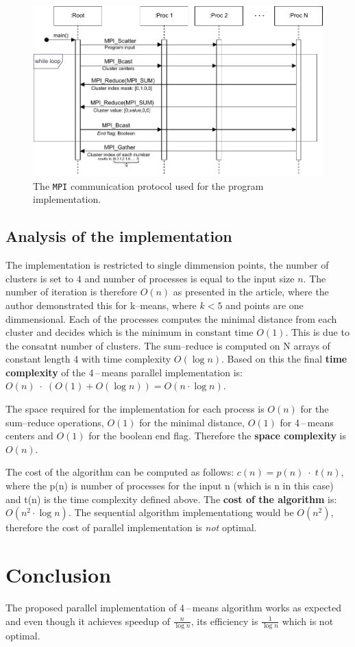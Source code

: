 \documentclass[a4paper, 11pt]{article}
\begin{document}
		\begin{figure}[h]
			\centering
			\includegraphics[width=1\textwidth]{seqdiag.pdf}
			\caption{The \texttt{MPI} communication protocol used for the program implementation.}
			\label{fig:seqdiag}
		\end{figure}

	\subsection{Analysis of the implementation}
	The implementation is restricted to single dimmension points, the number
	of clusters is set to $4$ and number of processes is equal to the
	input size $n$. The number of iteration is therefore $O(n)$ as presented
	in the article\;\cite{kmeans:iter}, where the author demonstrated this for
	k--means, where $k<5$ and points are one dimmensional. Each of the
	processes computes the minimal distance from each cluster and decides
	which is the minimum in constant time $O(1)$. This is due to the consatnt
	number of clusters. The sum--reduce is computed on N arrays of constant
	length 4 with time complexity $O(\log n)$. Based on this the final \textbf{time complexity} of the 4\,--\,means parallel implementation is: $O(n)\;\cdot\;(O(1) + O(\log n)) = O(n\cdot\log n)$.

	The space required for the implementation for each process is $O(n)$ for the sum--reduce operations, $O(1)$ for the minimal distance, $O(1)$ for 4\,--\,means centers and $O(1)$ for the boolean end flag. Therefore the \textbf{space complexity} is $O(n)$.

	The cost of the algorithm can be computed as follows: $c(n) = p(n)\;\cdot\;t(n)$, where the p(n) is number of processes for the input n (which is n in this case) and t(n) is the time complexity defined above. The \textbf{cost of the algorithm} is: $O(n^2\cdot\log n)$. The sequential algorithm implementationg would be $O(n^2)$, therefore the cost of parallel implementation is \textit{not} optimal.


\section{Conclusion}
The proposed parallel implementation of 4\,--\,means algorithm works as expected and even though it achieves speedup of $\frac{n}{\log n}$, its efficiency is $\frac{1}{\log n}$ which is not optimal.



\end{document}
